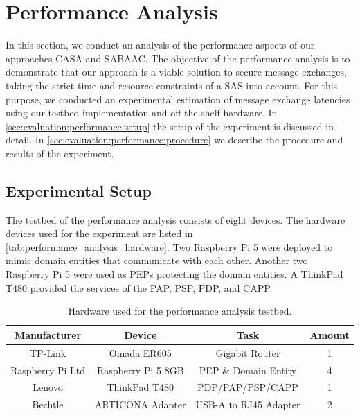 \section{Performance Analysis}
In this section, we conduct an analysis of the performance aspects of our approaches CASA and SABAAC.
The objective of the performance analysis is to demonstrate that our approach is a viable solution to secure message exchanges, taking the strict time and resource constraints of a SAS into account.
For this purpose, we conducted an experimental estimation of message exchange latencies using our testbed implementation and off-the-shelf hardware.
In \autoref{sec:evaluation:performance:setup} the setup of the experiment is discussed in detail.
In \autoref{sec:evaluation:performance:procedure} we describe the procedure and results of the experiment.

\subsection{Experimental Setup}
\label{sec:evaluation:performance:setup}
The testbed of the performance analysis consists of eight devices.
The hardware devices used for the experiment are listed in \autoref{tab:performance_analysis_hardware}.
Two Raspberry Pi 5 were deployed to mimic domain entities that communicate with each other.
Another two Raspberry Pi 5 were used as PEPs protecting the domain entities.
A ThinkPad T480 provided the services of the PAP, PSP, PDP, and CAPP.
\begin{table}
    \centering
    \small
    \caption{Hardware used for the performance analysis testbed.}
    \label{tab:performance_analysis_hardware}
    \begin{tabular}{c c c c}
    \toprule
    Manufacturer & Device & Task & Amount\\
    \midrule
    TP-Link & Omada ER605 & Gigabit Router & 1\\
    Raspberry Pi Ltd & Raspberry Pi 5 8GB & PEP \& Domain Entity & 4\\
    Lenovo & ThinkPad T480 & PDP/PAP/PSP/CAPP & 1\\
    Bechtle & ARTICONA Adapter & USB-A to RJ45 Adapter & 2\\
    \bottomrule
    \end{tabular}
\end{table}

